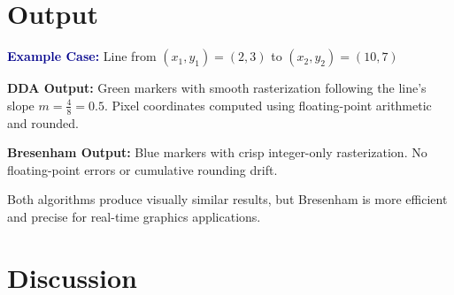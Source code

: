 \documentclass[12pt,a4paper]{article}
\begin{document}
\section*{Output}
\begin{tcolorbox}[colback=lightgreen!20, colframe=darkblue!50]
\textbf{\textcolor{darkblue}{Example Case:}} Line from $(x_1, y_1) = (2, 3)$ to $(x_2, y_2) = (10, 7)$

\textbf{DDA Output:} Green markers with smooth rasterization following the line's slope $m = \frac{4}{8} = 0.5$. Pixel coordinates computed using floating-point arithmetic and rounded.

\textbf{Bresenham Output:} Blue markers with crisp integer-only rasterization. No floating-point errors or cumulative rounding drift.

Both algorithms produce visually similar results, but Bresenham is more efficient and precise for real-time graphics applications.
\end{tcolorbox}

\section*{Discussion}
\end{document}
